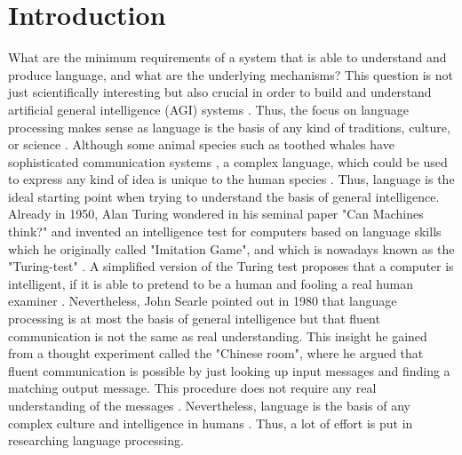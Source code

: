 \section*{Introduction}
What are the minimum requirements of a system that is able to understand and produce language, and what are the underlying mechanisms? This question is not just scientifically interesting but also crucial in order to build and understand artificial general intelligence (AGI) systems \cite{ge2024openagi,bubeck2023sparks}. Thus, the focus on language processing makes sense as language is the basis of any kind of traditions, culture, or science \cite{carruthers2002cognitive, baumeister2002collective}. Although some animal species such as toothed whales have sophisticated  communication systems \cite{bergler2019orca, janik2014cetacean}, a complex language, which could be used to express any kind of idea is unique to the human species \cite{berwick2013evolution}. Thus, language is the ideal starting point when trying to understand the basis of general intelligence. Already in 1950, Alan Turing wondered in his seminal paper "Can Machines think?" \cite{turing1950computing} and invented an intelligence test for computers based on language skills which he originally called "Imitation Game", and which is nowadays known as the "Turing-test" \cite{turing1950computing, moor1976analysis, piccinini2000turing}. A simplified version of the Turing test proposes that a computer is intelligent, if it is able to pretend to be a human and fooling a real human examiner \cite{piccinini2000turing, sterrett2020genius}. Nevertheless, John Searle pointed out in 1980 that language processing is at most the basis of general intelligence but that fluent communication is not the same as real understanding. This insight he gained from a thought experiment called the "Chinese room", where he argued that fluent communication is possible by just looking up input messages and finding a matching output message. This procedure does not require any real understanding of the messages \cite{searle1980minds}. Nevertheless, language is the basis of any complex culture and intelligence in humans \cite{gentner2003language,pinker2003language}. Thus, a lot of effort is put in researching language processing. 

